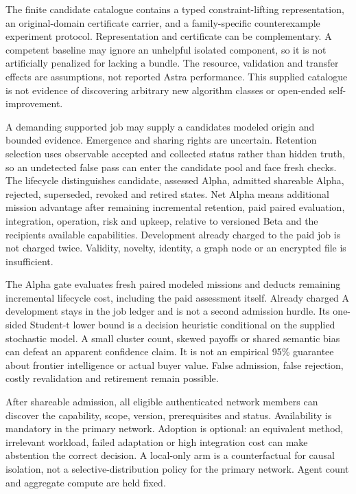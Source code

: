 \documentclass[
  10pt,
]{article}
\begin{document}
The finite candidate catalogue contains a typed constraint-lifting
representation, an original-domain certificate carrier, and a
family-specific counterexample experiment protocol. Representation and
certificate can be complementary. A competent baseline may ignore an
unhelpful isolated component, so it is not artificially penalized for
lacking a bundle. The resource, validation and transfer effects are
assumptions, not reported Astra performance. This supplied catalogue is
not evidence of discovering arbitrary new algorithm classes or
open-ended self-improvement.

A demanding supported job may supply a candidate\textquotesingle s
modeled origin and bounded evidence. Emergence and sharing rights are
uncertain. Retention selection uses observable accepted and collected
status rather than hidden truth, so an undetected false pass can enter
the candidate pool and face fresh checks. The lifecycle distinguishes
candidate, assessed Alpha, admitted shareable Alpha, rejected,
superseded, revoked and retired states. Net Alpha means additional
mission advantage after remaining incremental retention, paid paired
evaluation, integration, operation, risk and upkeep, relative to
versioned Beta and the recipient\textquotesingle s available
capabilities. Development already charged to the paid job is not charged
twice. Validity, novelty, identity, a graph node or an encrypted file is
insufficient.

The Alpha gate evaluates fresh paired modeled missions and deducts
remaining incremental lifecycle cost, including the paid assessment
itself. Already charged A development stays in the job ledger and is not
a second admission hurdle. Its one-sided Student-t lower bound is a
decision heuristic conditional on the supplied stochastic model. A small
cluster count, skewed payoffs or shared semantic bias can defeat an
apparent confidence claim. It is not an empirical 95\% guarantee about
frontier intelligence or actual buyer value. False admission, false
rejection, costly revalidation and retirement remain possible.

After shareable admission, all eligible authenticated network members
can discover the capability, scope, version, prerequisites and status.
Availability is mandatory in the primary network. Adoption is optional:
an equivalent method, irrelevant workload, failed adaptation or high
integration cost can make abstention the correct decision. A local-only
arm is a counterfactual for causal isolation, not a
selective-distribution policy for the primary network. Agent count and
aggregate compute are held fixed.
\end{document}
